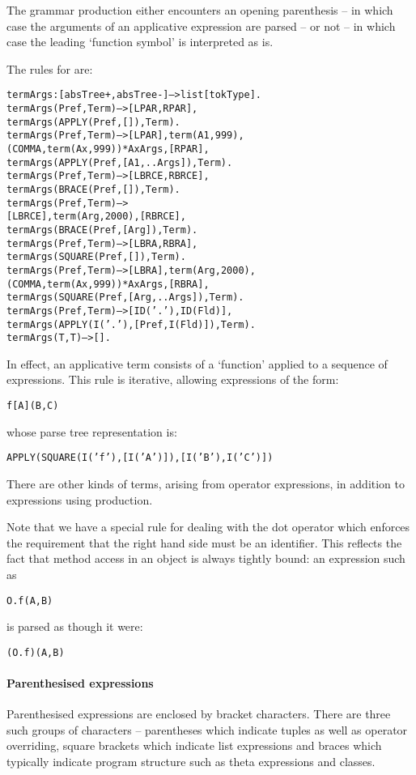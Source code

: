 The  grammar production either encounters an opening parenthesis -- in which case the arguments of an applicative expression are parsed -- or not -- in which case the leading `function symbol' is interpreted as is.

The rules for  are:
\begin{alltt}
termArgs:[absTree+,absTree-]-->list[tokType].
termArgs(Pref,Term) --> [LPAR,RPAR],
    termArgs(APPLY(Pref,[]),Term).
termArgs(Pref,Term) --> [LPAR],term(A1,999),
    (COMMA,term(Ax,999))*Ax\uphat{}Args,[RPAR],
    termArgs(APPLY(Pref,[A1,..Args]),Term).
termArgs(Pref,Term) --> [LBRCE,RBRCE],
    termArgs(BRACE(Pref,[]),Term).
termArgs(Pref,Term) --> 
    [LBRCE],term(Arg,2000),[RBRCE],
    termArgs(BRACE(Pref,[Arg]),Term).
termArgs(Pref,Term) --> [LBRA,RBRA],
    termArgs(SQUARE(Pref,[]),Term).
termArgs(Pref,Term) --> [LBRA],term(Arg,2000),
    (COMMA,term(Ax,999))*Ax\uphat{}Args,[RBRA],
    termArgs(SQUARE(Pref,[Arg,..Args]),Term).
termArgs(Pref,Term) --> [ID('.'),ID(Fld)],
    termArgs(APPLY(I('.'),[Pref,I(Fld)]),Term).
termArgs(T,T)-->[].
\end{alltt}
In effect, an applicative term consists of a `function' applied to a sequence of expressions. This rule is iterative, allowing expressions of the form:
\begin{alltt}
f[A](B,C)
\end{alltt}
whose parse tree representation is:
\begin{alltt}
APPLY(SQUARE(I('f'),[I('A')]),[I('B'),I('C')])
\end{alltt}
There are other kinds of  terms, arising from operator expressions, in addition to expressions using  production. 

Note that we have a special rule for dealing with the dot operator which enforces the requirement that the right hand side must be an identifier. This reflects the fact that method access in an object is always tightly bound: an expression such as
\begin{alltt}
O.f(A,B)
\end{alltt}
is parsed as though it were:
\begin{alltt}
(O.f)(A,B)
\end{alltt}

\paragraph{Parenthesised expressions}
Parenthesised expressions are enclo\-sed by brack\-et characters. There are three such groups of characters -- parentheses \q{()} which indicate tuples as well as operator overriding, square brackets \q{[]} which indicate list expressions and braces \q{\{\}} which typically indicate program structure such as theta expressions and classes.

